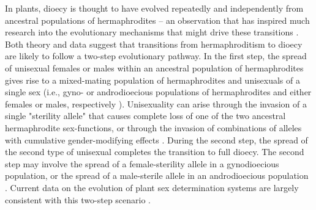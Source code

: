 \documentclass{article}
\begin{document}
In plants, dioecy is thought to have evolved repeatedly and independently from ancestral populations of hermaphrodites -- an observation that has inspired much research into the evolutionary mechanisms that might drive these transitions \citep{Westergaard1958, SakaiWeller1999, Charlesworth2006, Bachtrog2014, Renner2014, GoldbergOtto2017, KaferPannell2017}. Both theory and data suggest that transitions from hermaphroditism to dioecy are likely to follow a two-step evolutionary pathway. In the first step, the spread of unisexual females or males within an ancestral population of hermaphrodites gives rise to a mixed-mating population of hermaphrodites and unisexuals of a single sex (i.e., gyno- or androdioecious populations of hermaphrodites and either females or males, respectively \citep{Charlesworth1978a, Charlesworth1978b}). Unisexuality can arise through the invasion of a single "sterility allele" that causes complete loss of one of the two ancestral hermaphrodite sex-functions, or through the invasion of combinations of alleles with cumulative gender-modifying effects \citep{Charlesworth1978a, Charlesworth1978b, Charlesworth1999}. During the second step, the spread of the second type of unisexual completes the transition to full dioecy. The second step may involve the spread of a female-sterility allele in a gynodioecious population, or the spread of a male-sterile allele in an androdioecious population \citep{Westergaard1958, Charlesworth1978a, Charlesworth1978b, Charlesworth2006, Charlesworth2009, KaferPannell2017}. Current data on the evolution of plant sex determination systems are largely consistent with this two-step scenario \citep{Westergaard1958, Charlesworth2002, Charlesworth2006, Renner2014, Ashman2015}.
\end{document}
